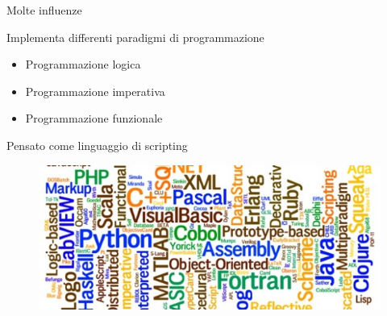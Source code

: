 \begin{frame}{Molte influenze}

	Implementa differenti paradigmi di programmazione
	\begin{itemize}
		\item Programmazione logica
		\item Programmazione imperativa
		\item Programmazione funzionale
	\end{itemize}

	\vspace{1em}
	Pensato come linguaggio di scripting

	\begin{figure}
		\centering
		\includegraphics[scale=0.4]{res/influenze}
	\end{figure}
\end{frame}